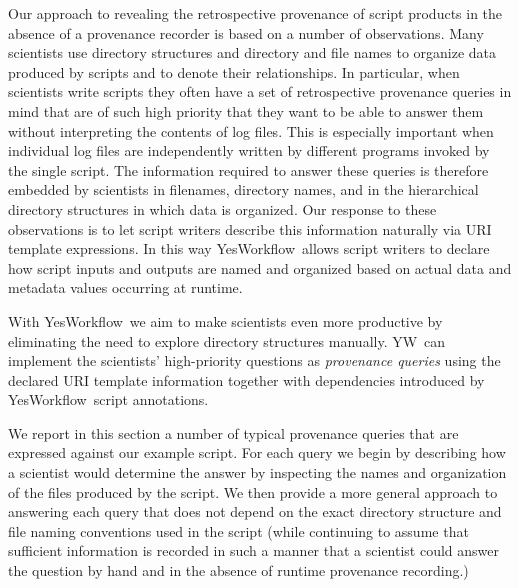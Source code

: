 \documentclass[nocopyrightspace]{sigplanconf}
\newcommand{\YW}{\textsf{YesWorkflow}}
\newcommand{\yw}{\textsf{YW}}
\begin{document}
Our approach to revealing the retrospective provenance of script
products in the absence of a provenance recorder is based on a number
of observations. Many scientists use directory structures and
directory and file names to organize data produced by scripts and to
denote their relationships. In particular, when scientists write
scripts they often have a set of retrospective provenance queries in
mind that are of such high priority that they want to be able to
answer them without interpreting the contents of log files. This is
especially important when individual log files are independently
written by different programs invoked by the single script.  The
information required to answer these queries is therefore embedded by
scientists in filenames, directory names, and in the hierarchical
directory structures in which data is organized.  Our response to
these observations is to let script writers describe this information
naturally via URI template expressions. In this way \YW\ allows script
writers to declare how script inputs and outputs are named and
organized based on actual data and metadata values occurring at
runtime.

With \YW\ we aim to make scientists even more productive by
eliminating the need to explore directory structures manually.  \yw\
can implement the scientists' high-priority questions as
\emph{provenance queries} using the declared URI template information
together with dependencies introduced by \YW\ script annotations.


We report in this section a number of typical provenance queries that
are expressed against our example script. For each query we begin by
describing how a scientist would determine the answer by inspecting
the names and organization of the files produced by the script. We
then provide a more general approach to answering each query that does
not depend on the exact directory structure and file naming
conventions used in the script (while continuing to assume that
sufficient information is recorded in such a manner that a scientist
could answer the question by hand and in the absence of runtime
provenance recording.)

\end{document}
